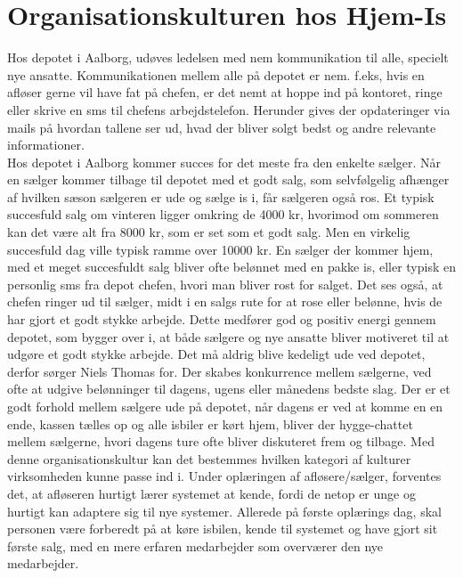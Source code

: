 \section{Organisationskulturen hos Hjem-Is}
Hos depotet i Aalborg, udøves ledelsen med nem kommunikation til alle, specielt nye ansatte. Kommunikationen mellem alle på depotet er nem. f.eks, hvis en afløser gerne vil have fat på chefen, er det nemt at hoppe ind på kontoret, ringe eller skrive en sms til chefens arbejdstelefon. Herunder gives der opdateringer via mails på hvordan tallene ser ud, hvad der bliver solgt bedst og andre relevante informationer. \\
Hos depotet i Aalborg kommer succes for det meste fra den enkelte sælger. Når en sælger kommer tilbage til depotet med et godt salg, som selvfølgelig afhænger af hvilken sæson sælgeren er ude og sælge is i, får sælgeren også ros. Et typisk succesfuld salg om vinteren ligger omkring de 4000 kr, hvorimod om sommeren kan det være alt fra 8000 kr, som er set som et godt salg. Men en virkelig succesfuld dag ville typisk ramme over 10000 kr. En sælger der kommer hjem, med et meget succesfuldt salg bliver ofte belønnet med en pakke is, eller typisk en personlig sms fra depot chefen, hvori man bliver rost for salget. Det ses også, at chefen ringer ud til sælger, midt i en salgs rute for at rose eller belønne, hvis de har gjort et godt stykke arbejde. Dette medfører god og positiv energi gennem depotet, som bygger over i, at både sælgere og nye ansatte bliver motiveret til at udgøre et godt stykke arbejde. Det må aldrig blive kedeligt ude ved depotet, derfor sørger Niels Thomas for. Der skabes konkurrence mellem sælgerne, ved ofte at udgive belønninger til dagens, ugens eller månedens bedste slag. Der er et godt forhold mellem sælgere ude på depotet, når dagens er ved at komme en en ende, kassen tælles op og alle isbiler er kørt hjem, bliver der hygge-chattet mellem sælgerne, hvori dagens ture ofte bliver diskuteret frem og tilbage. Med denne organisationskultur kan det bestemmes hvilken kategori af kulturer virksomheden kunne passe ind i. Under oplæringen af afløsere/sælger, forventes det, at afløseren hurtigt lærer systemet at kende, fordi de netop er unge og hurtigt kan adaptere sig til nye systemer. Allerede på første oplærings dag, skal personen være forberedt på at køre isbilen, kende til systemet og have gjort sit første salg, med en mere erfaren medarbejder som overværer den nye medarbejder. 
